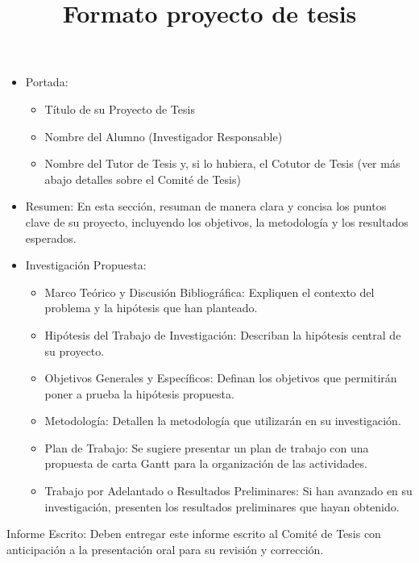 \documentclass{article}
\date{}
\title{Formato proyecto de tesis}
\begin{document}
\maketitle

\begin{itemize}
    \item Portada:
    \begin{itemize}
        \item Título de su Proyecto de Tesis
        \item Nombre del Alumno (Investigador Responsable)
        \item Nombre del Tutor de Tesis y, si lo hubiera, el Cotutor de Tesis (ver más abajo detalles sobre el Comité de Tesis)
    \end{itemize}
    \item Resumen: En esta sección, resuman de manera clara y concisa los puntos clave de su proyecto, incluyendo los objetivos, la metodología y los resultados esperados.
    \item Investigación Propuesta:
    \begin{itemize}
        \item Marco Teórico y Discusión Bibliográfica: Expliquen el contexto del problema y la hipótesis que han planteado.
        \item Hipótesis del Trabajo de Investigación: Describan la hipótesis central de su proyecto.
        \item Objetivos Generales y Específicos: Definan los objetivos que permitirán poner a prueba la hipótesis propuesta.
        \item Metodología: Detallen la metodología que utilizarán en su investigación.
        \item Plan de Trabajo: Se sugiere presentar un plan de trabajo con una propuesta de carta Gantt para la organización de las actividades.
        \item Trabajo por Adelantado o Resultados Preliminares: Si han avanzado en su investigación, presenten los resultados preliminares que hayan obtenido.
    \end{itemize}
\end{itemize}












Informe Escrito: Deben entregar este informe escrito al Comité de Tesis con anticipación a la presentación oral para su revisión y corrección.
\end{document}
